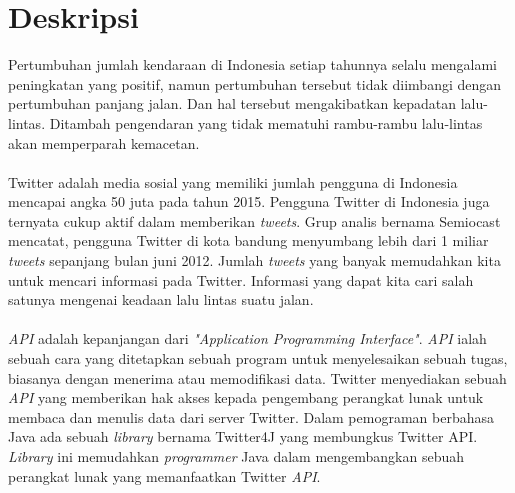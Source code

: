 \documentclass[a4paper,twoside]{article}
\begin{document}
\title{\@judultopik}
\author{\nama \textendash \@npm} 

\newcommand{\nama}{Steven Daniel}
\newcommand{\@npm}{2012730021}
\newcommand{\@judultopik}{Penentuan Tingkat Kemacetan Berdasarkan Twitter Menggunakan Jaringan Syaraf Tiruan} %
\newcommand{\jumpemb}{1} %
\newcommand{\tanggal}{09/10/2015}
\maketitle


\section{Deskripsi}
Pertumbuhan jumlah kendaraan di Indonesia setiap tahunnya selalu mengalami peningkatan yang positif, namun pertumbuhan tersebut tidak diimbangi dengan pertumbuhan panjang jalan. Dan hal tersebut mengakibatkan kepadatan lalu-lintas. Ditambah pengendaran yang tidak mematuhi rambu-rambu lalu-lintas akan memperparah kemacetan.\\\\
Twitter adalah media sosial yang memiliki jumlah pengguna di Indonesia mencapai angka 50 juta pada tahun 2015. Pengguna Twitter di Indonesia juga ternyata cukup aktif dalam memberikan \textit{tweets}. Grup analis bernama Semiocast mencatat, pengguna Twitter di kota bandung menyumbang lebih dari 1 miliar \textit{tweets} sepanjang bulan juni 2012. Jumlah \textit{tweets} yang banyak memudahkan kita untuk mencari informasi pada Twitter. Informasi yang dapat kita cari salah satunya mengenai keadaan lalu lintas suatu jalan.\\\\
\textit{API} adalah kepanjangan dari \textit{"Application Programming Interface"}. \textit{API} ialah sebuah cara yang ditetapkan sebuah program untuk menyelesaikan sebuah tugas, biasanya dengan menerima atau memodifikasi data. Twitter menyediakan sebuah \textit{API} yang memberikan hak akses kepada pengembang perangkat lunak untuk membaca dan menulis data dari server Twitter. Dalam pemograman berbahasa Java ada sebuah \textit{library} bernama Twitter4J yang membungkus Twitter API. \textit{Library} ini memudahkan \textit{programmer} Java dalam mengembangkan sebuah perangkat lunak yang memanfaatkan Twitter \textit{API}.\\\\
\end{document}
